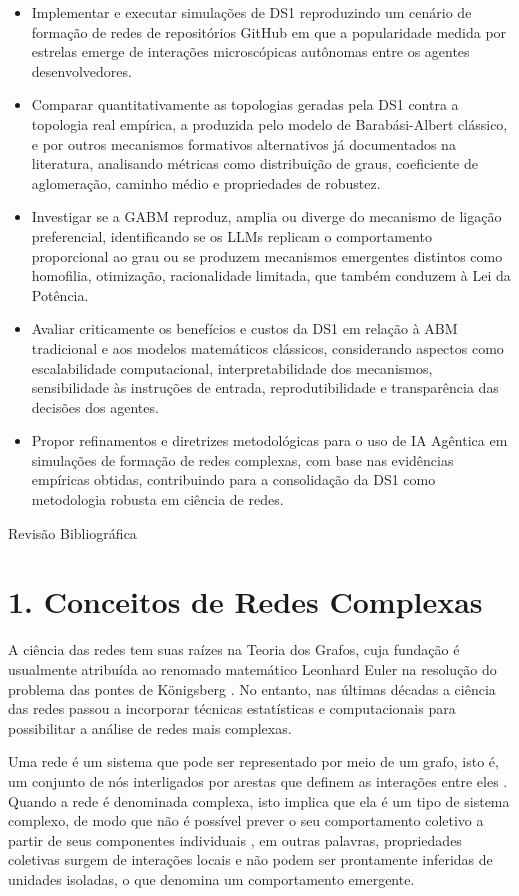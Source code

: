 \documentclass[12pt,oneside,a4paper,brazil,sumario=tradicional]{abntex2}
\begin{document}
\begin{itemize}
  \item Implementar e executar simulações de DS1 reproduzindo um cenário de formação de redes de repositórios GitHub em que a popularidade medida por estrelas emerge de interações microscópicas autônomas entre os agentes desenvolvedores.
  \item Comparar quantitativamente as topologias geradas pela DS1 contra a topologia real empírica, a produzida pelo modelo de Barabási-Albert clássico, e por outros mecanismos formativos alternativos já documentados na literatura, analisando métricas como distribuição de graus, coeficiente de aglomeração, caminho médio e propriedades de robustez.
  \item Investigar se a GABM reproduz, amplia ou diverge do mecanismo de  ligação preferencial, identificando se os LLMs replicam o comportamento proporcional ao grau ou se produzem mecanismos emergentes distintos como homofilia, otimização, racionalidade limitada, que também conduzem à Lei da Potência.
  \item Avaliar criticamente os benefícios e custos da DS1 em relação à ABM tradicional e aos modelos matemáticos clássicos, considerando aspectos como escalabilidade computacional, interpretabilidade dos mecanismos, sensibilidade às instruções de entrada, reprodutibilidade e transparência das decisões dos agentes.
  \item Propor refinamentos e diretrizes metodológicas para o uso de IA Agêntica em simulações de formação de redes complexas, com base nas evidências empíricas obtidas, contribuindo para a consolidação da DS1 como metodologia robusta em ciência de redes.
\end{itemize}
\begin{center}\Large Revisão Bibliográfica\end{center}
\section*{1. Conceitos de Redes Complexas}
A ciência das redes tem suas raízes na Teoria dos Grafos, cuja fundação é usualmente atribuída ao renomado matemático Leonhard Euler na resolução do problema das pontes de Königsberg \parencite{harary1960}. No entanto, nas últimas décadas a ciência das redes passou a incorporar técnicas estatísticas e computacionais para possibilitar a análise de redes mais complexas.

Uma rede é um sistema que pode ser representado por meio de um grafo, isto é,  um conjunto de nós interligados por arestas que definem as interações entre eles \parencite{newman2003, wang2003}. Quando a rede é denominada complexa, isto implica que ela é um tipo de sistema complexo, de modo que não é possível prever o seu comportamento coletivo a partir de seus componentes individuais \parencite{mata2020}, em outras palavras, propriedades coletivas surgem de interações locais e não podem ser prontamente inferidas de unidades isoladas, o que denomina um comportamento emergente.
\end{document}

